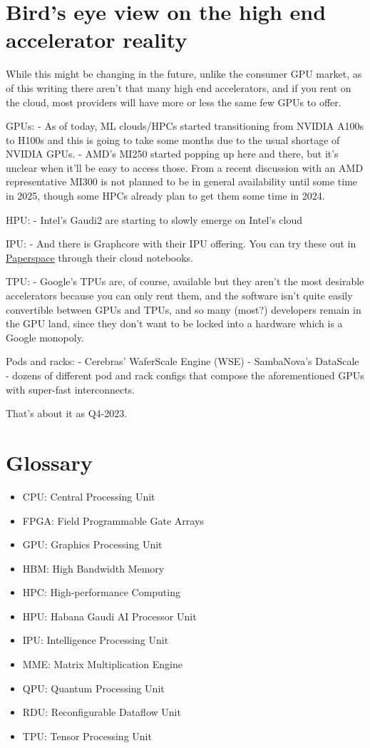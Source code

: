 \documentclass[
]{report}
\providecommand{\tightlist}{%
  \setlength{\itemsep}{0pt}\setlength{\parskip}{0pt}}\usepackage{longtable,booktabs,array}
\begin{document}
\section{Bird's eye view on the high end accelerator
reality}\label{birds-eye-view-on-the-high-end-accelerator-reality}

While this might be changing in the future, unlike the consumer GPU
market, as of this writing there aren't that many high end accelerators,
and if you rent on the cloud, most providers will have more or less the
same few GPUs to offer.

GPUs: - As of today, ML clouds/HPCs started transitioning from NVIDIA
A100s to H100s and this is going to take some months due to the usual
shortage of NVIDIA GPUs. - AMD's MI250 started popping up here and
there, but it's unclear when it'll be easy to access those. From a
recent discussion with an AMD representative MI300 is not planned to be
in general availability until some time in 2025, though some HPCs
already plan to get them some time in 2024.

HPU: - Intel's Gaudi2 are starting to slowly emerge on Intel's cloud

IPU: - And there is Graphcore with their IPU offering. You can try these
out in \href{https://www.paperspace.com/graphcore}{Paperspace} through
their cloud notebooks.

TPU: - Google's TPUs are, of course, available but they aren't the most
desirable accelerators because you can only rent them, and the software
isn't quite easily convertible between GPUs and TPUs, and so many
(most?) developers remain in the GPU land, since they don't want to be
locked into a hardware which is a Google monopoly.

Pods and racks: - Cerebras' WaferScale Engine (WSE) - SambaNova's
DataScale - dozens of different pod and rack configs that compose the
aforementioned GPUs with super-fast interconnects.

That's about it as Q4-2023.

\section{Glossary}\label{glossary}

\begin{itemize}
\tightlist
\item
  CPU: Central Processing Unit
\item
  FPGA: Field Programmable Gate Arrays
\item
  GPU: Graphics Processing Unit
\item
  HBM: High Bandwidth Memory
\item
  HPC: High-performance Computing
\item
  HPU: Habana Gaudi AI Processor Unit
\item
  IPU: Intelligence Processing Unit
\item
  MME: Matrix Multiplication Engine
\item
  QPU: Quantum Processing Unit
\item
  RDU: Reconfigurable Dataflow Unit
\item
  TPU: Tensor Processing Unit
\end{itemize}
\end{document}
